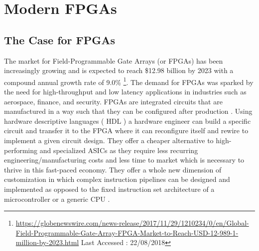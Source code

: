 
\section{Modern FPGAs}

\subsection{The Case for FPGAs}
The market for Field-Programmable Gate Arrays (or FPGAs)  has been increasingly growing and is expected to reach \$12.98 billion by 2023 with a compound annual growth rate of 9.0\% \footnote{\url{https://globenewswire.com/news-release/2017/11/29/1210234/0/en/Global-Field-Programmable-Gate-Array-FPGA-Market-to-Reach-USD-12-989-1-million-by-2023.html} Last Accessed : 22/08/2018 }. The demand for FPGAs was sparked by the need for high-throughput and low latency applications in industries such as aerospace, finance, and security. 
FPGAs are integrated circuits that are manufactured in a way such that they can be configured after production \cite{compton2002reconfigurable}. Using hardware descriptive languages ( HDL ) a hardware engineer can build a specific circuit and transfer it to the FPGA where it can reconfigure itself and rewire to implement a given circuit design. They offer a cheaper alternative to high-performing and specialized ASICs as they require less recurring engineering/manufacturing costs and less time to market which is necessary to thrive in this fast-paced economy. They offer a whole new dimension of customization in which complex instruction pipelines can be designed and implemented as opposed to the fixed instruction set architecture of a microcontroller or a generic CPU \cite{deepfpga}.

